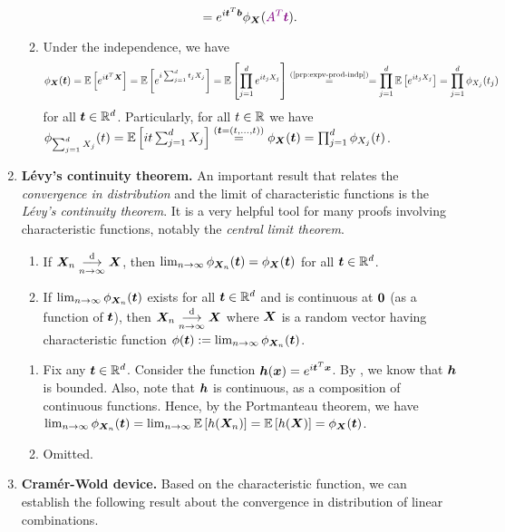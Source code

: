 \begin{enumerate}
\begin{pf}
\begin{enumerate}
\[=e^{i\vect{t}^{T}\vect{b}}\phi_{\vect{X}}(\vc{A^{T}\vect{t}}).\]
\item Under the independence, we have
\[
\phi_{\vect{X}}(\vect{t})=\expv{e^{i\vect{t}^{T}\vect{X}}}
=\expv{e^{i\sum_{j=1}^{d}t_jX_j}}
=\expv{\prod_{j=1}^{d}e^{it_jX_j}}
\overset{(\text{\Cref{prp:expv-prod-indp}})}{=}
=\prod_{j=1}^{d}\expv{e^{it_jX_j}}
=\prod_{j=1}^{d}\phi_{X_j}(t_{j})
\]
for all \(\bm{t}\in\mathbb{R}^{d}\). Particularly, for all \(t\in\mathbb{R}\) we have
\(\phi_{\sum_{j=1}^{d}X_j}(t)=\mathbb{E}\left[it\sum_{j=1}^{d}X_j\right]
\overset{(\bm{t}=(t,\dotsc,t))}{=}
\phi_{\bm{X}}(\bm{t})
=\prod_{j=1}^{d}\phi_{X_j}(t)
\).
\end{enumerate}
\end{pf}
\item \textbf{L\'evy's continuity theorem.} An important result that relates
the \emph{convergence in distribution} and the limit of characteristic functions
is the \emph{L\'evy's continuity theorem}. It is a very helpful tool for many
proofs involving characteristic functions, notably the \emph{central limit
theorem}.

\begin{theorem}
\label{thm:levy-cont}
\hfill
\begin{enumerate}
\item If \(\bm{X}_n\underset{n\to\infty}{\overset{\text{d}}{\longrightarrow}} \bm{X}\), then 
\(\lim_{n\to\infty}\phi_{\bm{X}_n}(\bm{t})
=\phi_{\bm{X}}(\bm{t})\) for all \(\bm{t}\in\mathbb{R}^{d}\).
\item If \(\lim_{n\to\infty}\phi_{\bm{X}_n}(\bm{t})\) exists for all
\(\bm{t}\in\mathbb{R}^{d}\) and is continuous at \(\bm{0}\) (as a function of
\(\bm{t}\)), then \(\bm{X}_n\underset{n\to\infty}{\overset{\text{d}}{\longrightarrow}}\bm{X}\) where \(\bm{X}\) is a
random vector having characteristic function \(\phi(\bm{t}):=
\lim_{n\to\infty}\phi_{\bm{X}_n}(\bm{t})\).
\end{enumerate}
\end{theorem}
\begin{pf}
\begin{enumerate}
\item Fix any \(\bm{t}\in\mathbb{R}^{d}\). Consider the function
\(\bm{h}(\bm{x})=e^{i\bm{t}^{T}\bm{x}}\). By , we
know that \(\bm{h}\) is bounded. Also, note that \(\bm{h}\) is
continuous, as a composition of continuous functions. Hence, by the Portmanteau
theorem, we have \(\lim_{n\to\infty}\phi_{\bm{X}_n}(\bm{t})
=\lim_{n\to\infty}\mathbb{E}\left[h(\bm{X}_n)\right]
=\mathbb{E}\left[h(\bm{X})\right]=\phi_{\bm{X}}(\bm{t})\).
\item Omitted.
\end{enumerate}
\end{pf}
\item \textbf{Cram\'er-Wold device.} Based on the characteristic function, we
can establish the following result about the convergence in
distribution of linear combinations.


\end{enumerate}
